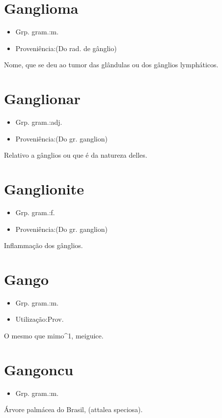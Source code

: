\section{Ganglioma}
\begin{itemize}
\item {Grp. gram.:m.}
\end{itemize}
\begin{itemize}
\item {Proveniência:(Do rad. de \textunderscore gânglio\textunderscore )}
\end{itemize}
Nome, que se deu ao tumor das glândulas ou dos gânglios lympháticos.
\section{Ganglionar}
\begin{itemize}
\item {Grp. gram.:adj.}
\end{itemize}
\begin{itemize}
\item {Proveniência:(Do gr. \textunderscore ganglion\textunderscore )}
\end{itemize}
Relativo a gânglios ou que é da natureza delles.
\section{Ganglionite}
\begin{itemize}
\item {Grp. gram.:f.}
\end{itemize}
\begin{itemize}
\item {Proveniência:(Do gr. \textunderscore ganglion\textunderscore )}
\end{itemize}
Inflammação dos gânglios.
\section{Gango}
\begin{itemize}
\item {Grp. gram.:m.}
\end{itemize}
\begin{itemize}
\item {Utilização:Prov.}
\end{itemize}
O mesmo que \textunderscore mimo\textunderscore ^1, meiguice.
\section{Gangoncu}
\begin{itemize}
\item {Grp. gram.:m.}
\end{itemize}
Árvore palmácea do Brasil, (\textunderscore attalea speciosa\textunderscore ).
